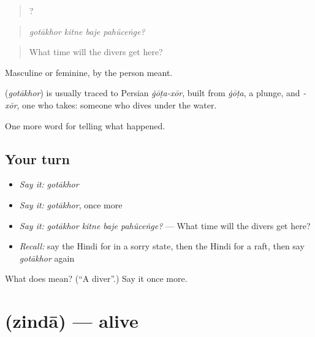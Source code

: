 \begin{quote}
   ?
\end{quote}

\begin{quote}
\emph{gotākhor kitne baje pahũceṅge?}
\end{quote}

\begin{quote}
What time will the divers get here?
\end{quote}

Masculine or feminine, by the person meant.

\begin{cousinweb}
\textbf{} (\emph{gotākhor}) is usually traced to Persian \emph{ġōṭa-xōr}, built from \emph{ġōṭa}, a plunge, and \emph{-xōr}, one who takes: someone who dives under the water.
\end{cousinweb}

\begin{grammarlens}[title={What you've built}]
One more word for telling what happened.
\end{grammarlens}

\subsection*{Your turn}
\begin{itemize}
\raggedright
  \item \emph{Say it:} \emph{gotākhor}
  \item \emph{Say it:} \emph{gotākhor}, once more
  \item \emph{Say it:} \emph{gotākhor kitne baje pahũceṅge?} — What time will the divers get here?
  \item \emph{Recall:} say the Hindi for in a sorry state, then the Hindi for a raft, then say \emph{gotākhor} again
\end{itemize}

\begin{tcolorbox}[breakable,colback=teal!4,colframe=teal!35!black,title={Before you move on}]
What does  mean? (\textquotedblleft{}A diver\textquotedblright{}.) Say it once more.
\end{tcolorbox}
\section[\texorpdfstring{\hi{ज़िंदा} (zindā)}{ज़िंदा (zindā)}]{ (zindā) — alive}

